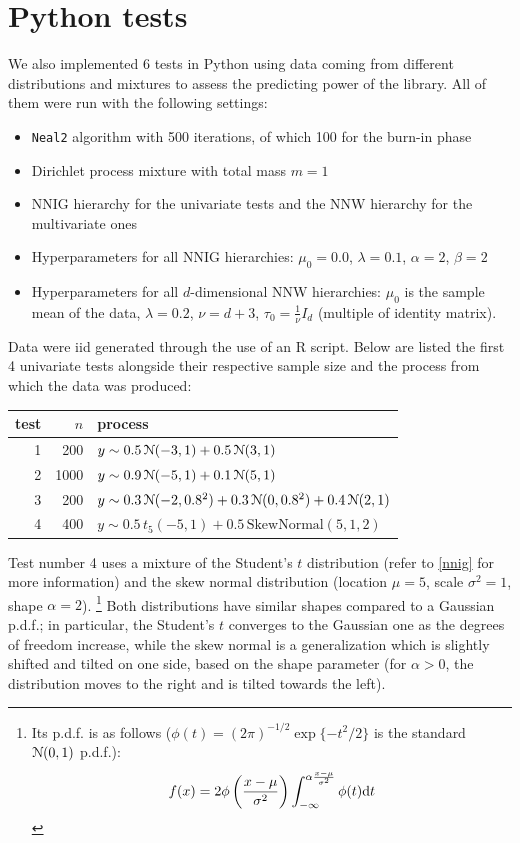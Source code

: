\section{Python tests}\label{chap-py-test}
We also implemented 6 tests in Python using data coming from different distributions and mixtures to assess the predicting power of the library.
All of them were run with the following settings:
\begin{itemize}
	\item \verb|Neal2| algorithm with 500 iterations, of which 100 for the burn-in phase
	\item Dirichlet process mixture with total mass $m=1$
	\item NNIG hierarchy for the univariate tests and the NNW hierarchy for the multivariate ones
	\item Hyperparameters for all NNIG hierarchies: $\mu_0 = 0.0$, $\lambda = 0.1$, $\alpha = 2$, $\beta = 2$
	\item Hyperparameters for all $d$-dimensional NNW hierarchies: $\mu_0$ is the sample mean of the data, $\lambda = 0.2$, $\nu = d + 3$, $\tau_0 = \frac{1}{\nu} I_d$ (multiple of identity matrix).
\end{itemize}
Data were iid generated through the use of an R script.
Below are listed the first 4 univariate tests alongside their respective sample size and the process from which the data was produced:
\begin{center}
	\begin{tabular}{r|r|l}
		test & $n$ & process \\ \hline
		1 &  200 & $y \sim 0.5 \, \mathcal N(-3, 1) + 0.5 \, \mathcal N(3, 1)$ \\
		2 & 1000 & $y \sim 0.9 \, \mathcal N(-5, 1) + 0.1 \, \mathcal N(5, 1)$ \\
		3 &  200 & $y \sim 0.3 \, \mathcal N(-2, 0.8^2) + 0.3 \, \mathcal N(0, 0.8^2) + 0.4 \, \mathcal N(2, 1)$ \\
		4 &  400 & $y \sim 0.5 \, t_5(-5, 1 ) + 0.5 \, \text{SkewNormal}(5, 1, 2)$
	\end{tabular}
\end{center}
Test number 4 uses a mixture of the Student's $t$ distribution (refer to \ref{nnig} for more information) and the skew normal distribution (location $\mu=5$, scale $\sigma^2=1$, shape $\alpha=2$). \footnote{Its p.d.f. is as follows ($\phi(t) = (2\pi)^{-1/2} \exp\{-t^2/2\}$ is the standard $\mathcal N(0,1)$ p.d.f.):
$$
f(x) = 2 \phi\left(\frac{x-\mu}{\sigma^2}\right) \int_{-\infty}^{\alpha \frac{x-\mu}{\sigma^2}} \phi(t) \mathrm d t
$$}
Both distributions have similar shapes compared to a Gaussian p.d.f.; in particular, the Student's $t$ converges to the Gaussian one as the degrees of freedom increase, while the skew normal is a generalization which is slightly shifted and tilted on one side, based on the shape parameter (for $\alpha>0$, the distribution moves to the right and is tilted towards the left). \\
